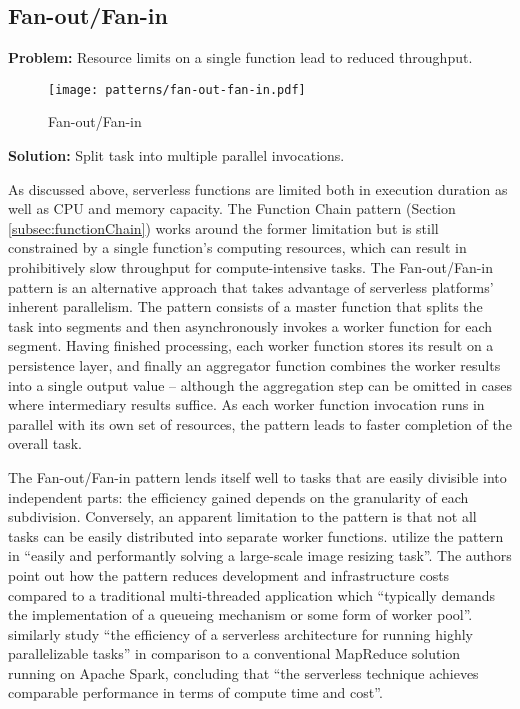 \subsection{Fan-out/Fan-in} \label{subsec:FanoutFanin}

\textbf{Problem:} Resource limits on a single function lead to reduced throughput.

\begin{figure}[h]
  \centering
  \texttt{[image: patterns/fan-out-fan-in.pdf]}
  \caption{Fan-out/Fan-in}
  \label{fig:fantOutFanIn}
\end{figure}

\textbf{Solution:} Split task into multiple parallel invocations.

As discussed above, serverless functions are limited both in execution duration as well as CPU and memory capacity. The Function Chain pattern (Section \ref{subsec:functionChain}) works around the former limitation but is still constrained by a single function's computing resources, which can result in prohibitively slow throughput for compute-intensive tasks. The Fan-out/Fan-in pattern is an alternative approach that takes advantage of serverless platforms' inherent parallelism. The pattern consists of a master function that splits the task into segments and then asynchronously invokes a worker function for each segment. Having finished processing, each worker function stores its result on a persistence layer, and finally an aggregator function combines the worker results into a single output value -- although the aggregation step can be omitted in cases where intermediary results suffice. As each worker function invocation runs in parallel with its own set of resources, the pattern leads to faster completion of the overall task. \parencite{zambrano18patterns}

The Fan-out/Fan-in pattern lends itself well to tasks that are easily divisible into independent parts: the efficiency gained depends on the granularity of each subdivision. Conversely, an apparent limitation to the pattern is that not all tasks can be easily distributed into separate worker functions. \textcite{mcgrath16cloudEventParadigms} utilize the pattern in ``easily and performantly solving a large-scale image resizing task''. The authors point out how the pattern reduces development and infrastructure costs compared to a traditional multi-threaded application which ``typically demands the implementation of a queueing mechanism or some form of worker pool''. \textcite{lavoie19efficiency} similarly study ``the efficiency of a serverless architecture for running highly parallelizable tasks'' in comparison to a conventional MapReduce solution running on Apache Spark, concluding that ``the serverless technique achieves comparable performance in terms of compute time and cost''.


